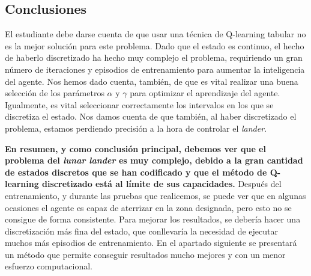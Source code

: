 \documentclass{article}
\begin{document}
\subsection{Conclusiones}
El estudiante debe darse cuenta de que usar una técnica de Q-learning tabular no es la mejor solución para este problema. Dado que el estado es continuo, el hecho de haberlo discretizado ha hecho muy complejo el problema, requiriendo un gran número de iteraciones y episodios de entrenamiento para aumentar la inteligencia del agente. Nos hemos dado cuenta, también, de que es vital realizar una buena selección de los parámetros $\alpha$ y $\gamma$ para optimizar el aprendizaje del agente. Igualmente, es vital seleccionar correctamente los intervalos en los que se discretiza el estado. Nos damos cuenta de que también, al haber discretizado el problema, estamos perdiendo precisión a la hora de controlar el \textit{lander}.

\textbf{En resumen, y como conclusión principal, debemos ver que el problema del \textit{lunar lander} es muy complejo, debido a la gran cantidad de estados discretos que se han codificado y que el método de Q-learning discretizado está al límite de sus capacidades.} Después del entrenamiento, y durante las pruebas que realicemos, se puede ver que en algunas ocasiones el agente es capaz de aterrizar en la zona designada, pero esto no se consigue de forma consistente. Para mejorar los resultados, se debería hacer una discretización más fina del estado, que conllevaría la necesidad de ejecutar muchos más episodios de entrenamiento. En el apartado siguiente se presentará un método que permite conseguir resultados mucho mejores y con un menor esfuerzo computacional.
\end{document}
